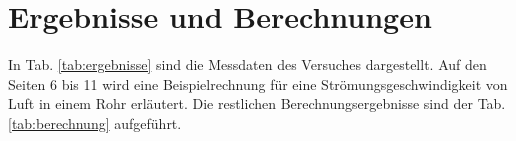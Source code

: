 \section{Ergebnisse und Berechnungen}
\label{sec:ergebnisse}

In Tab. \ref{tab:ergebnisse} sind die Messdaten des Versuches dargestellt. Auf den Seiten 6 bis 11 wird eine Beispielrechnung für eine Strömungsgeschwindigkeit von Luft in einem Rohr erläutert. Die restlichen Berechnungsergebnisse sind der Tab. \ref{tab:berechnung} aufgeführt.
\begin{table}[h!]
	\centering
	\renewcommand{\arraystretch}{1.2}
	\caption{gut gefälschte Volumenströme und Temperaturen der verschiedenen Rohre für Wasser und Luft}
\end{table}
